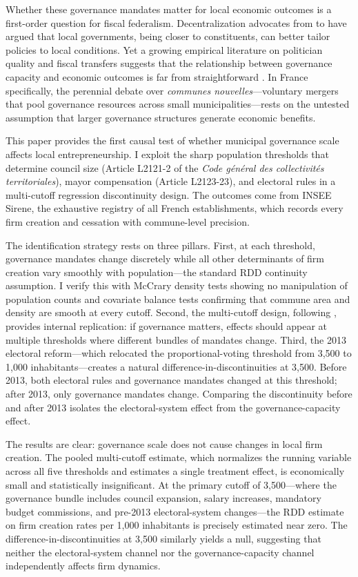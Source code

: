 \documentclass[12pt]{article}
\begin{document}
Whether these governance mandates matter for local economic outcomes is a first-order question for fiscal federalism. Decentralization advocates from \citet{tiebout1956} to \citet{oates1972} have argued that local governments, being closer to constituents, can better tailor policies to local conditions. Yet a growing empirical literature on politician quality and fiscal transfers suggests that the relationship between governance capacity and economic outcomes is far from straightforward \citep{ferraz2011, gagliarducci2013, brollo2013}. In France specifically, the perennial debate over \textit{communes nouvelles}---voluntary mergers that pool governance resources across small municipalities---rests on the untested assumption that larger governance structures generate economic benefits.

This paper provides the first causal test of whether municipal governance scale affects local entrepreneurship. I exploit the sharp population thresholds that determine council size (Article L2121-2 of the \textit{Code g\'{e}n\'{e}ral des collectivit\'{e}s territoriales}), mayor compensation (Article L2123-23), and electoral rules in a multi-cutoff regression discontinuity design. The outcomes come from INSEE Sirene, the exhaustive registry of all French establishments, which records every firm creation and cessation with commune-level precision.

The identification strategy rests on three pillars. First, at each threshold, governance mandates change discretely while all other determinants of firm creation vary smoothly with population---the standard RDD continuity assumption. I verify this with McCrary density tests showing no manipulation of population counts and covariate balance tests confirming that commune area and density are smooth at every cutoff. Second, the multi-cutoff design, following \citet{cattaneo2016}, provides internal replication: if governance matters, effects should appear at multiple thresholds where different bundles of mandates change. Third, the 2013 electoral reform---which relocated the proportional-voting threshold from 3,500 to 1,000 inhabitants---creates a natural difference-in-discontinuities at 3,500. Before 2013, both electoral rules and governance mandates changed at this threshold; after 2013, only governance mandates change. Comparing the discontinuity before and after 2013 isolates the electoral-system effect from the governance-capacity effect.

The results are clear: governance scale does not cause changes in local firm creation. The pooled multi-cutoff estimate, which normalizes the running variable across all five thresholds and estimates a single treatment effect, is economically small and statistically insignificant. At the primary cutoff of 3,500---where the governance bundle includes council expansion, salary increases, mandatory budget commissions, and pre-2013 electoral-system changes---the RDD estimate on firm creation rates per 1,000 inhabitants is precisely estimated near zero. The difference-in-discontinuities at 3,500 similarly yields a null, suggesting that neither the electoral-system channel nor the governance-capacity channel independently affects firm dynamics.
\end{document}
